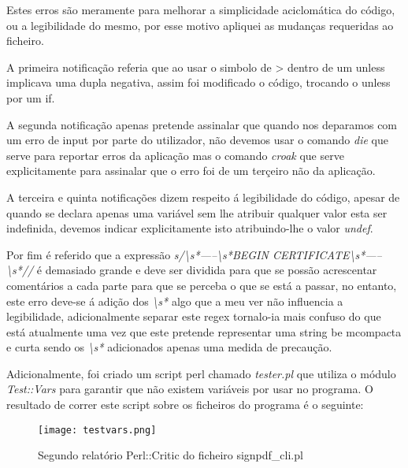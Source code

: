 \par Estes erros são meramente para melhorar a simplicidade aciclomática do código, ou a legibilidade do mesmo, por esse motivo apliquei as mudanças requeridas ao ficheiro.
\par A primeira notificação referia que ao usar o simbolo de > dentro de um unless implicava uma dupla negativa, assim foi modificado o código, trocando o unless por um if.
\par A segunda notificação apenas pretende assinalar que quando nos deparamos com um erro de input por parte do utilizador, não devemos usar o comando \textit{die} que serve para reportar erros da aplicação mas o comando \textit{croak} que serve explicitamente para assinalar que o erro foi de um terçeiro não da aplicação.
\par A terceira e quinta notificações dizem respeito á legibilidade do código, apesar de quando se declara apenas uma variável sem lhe atribuir qualquer valor esta ser indefinida, devemos indicar explicitamente isto atribuindo-lhe o valor \textit{undef}.
\par Por fim é referido que a expressão \textit{s/\textbackslash s*-----\textbackslash s*BEGIN CERTIFICATE\textbackslash s*-----\textbackslash s*//} é demasiado grande e deve ser dividida para que se possão acrescentar comentários a cada parte para que se perceba o que se está a passar, no entanto, este erro deve-se á adição dos \textit{\textbackslash s*} algo que a meu ver não influencia a legibilidade, adicionalmente separar este regex tornalo-ia mais confuso do que está atualmente uma vez que este pretende representar uma string be mcompacta e curta sendo os \textit{\textbackslash s*} adicionados apenas uma medida de precaução.
\hfill\newline
\par Adicionalmente, foi criado um script perl chamado \textit{tester.pl} que utiliza o módulo \textit{Test::Vars} para garantir que não existem variáveis por usar no programa. O resultado de correr este script sobre os ficheiros do programa é o seguinte:

\begin{figure}[H]

  \centering
  \captionsetup{justification=centering}

  \texttt{[image: testvars.png]}
  
  \caption {Segundo relatório Perl::Critic do ficheiro signpdf\_cli.pl}

\end{figure}


